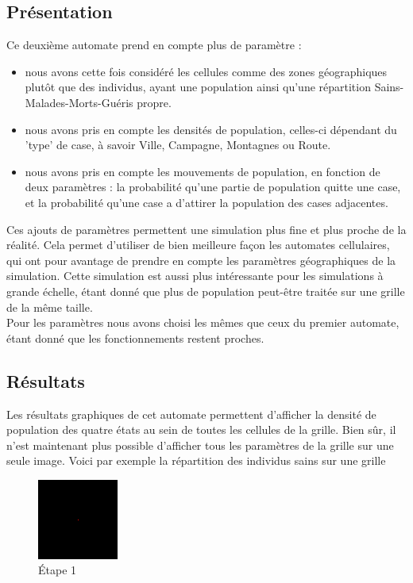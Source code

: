 \documentclass{article}
\begin{document}
\subsection{Présentation}
	Ce deuxième automate prend en compte plus de paramètre : 
	\begin{itemize}
	\item nous avons cette fois considéré les cellules comme des zones géographiques plutôt que des individus, ayant une population ainsi qu'une répartition Sains-Malades-Morts-Guéris propre.
	\item nous avons pris en compte les densités de population, celles-ci dépendant du 'type' de case, à savoir Ville, Campagne, Montagnes ou Route.
	\item nous avons pris en compte les mouvements de population, en fonction de deux paramètres : la probabilité qu'une partie de population quitte une case, et la probabilité qu'une case a d'attirer la population des cases adjacentes.
	\end{itemize}
	
	Ces ajouts de paramètres permettent une simulation plus fine et plus proche de la réalité. Cela permet d'utiliser de bien meilleure façon les automates cellulaires, qui ont pour avantage de prendre en compte les paramètres géographiques de la simulation. Cette simulation est aussi plus intéressante pour les simulations à grande échelle, étant donné que plus de population peut-être traitée sur une grille de la même taille.\\

Pour les paramètres nous avons choisi les mêmes que ceux du premier automate, étant donné que les fonctionnements restent proches. 


\subsection{Résultats}

Les résultats graphiques de cet automate permettent d'afficher la densité de population des quatre états au sein de toutes les cellules de la grille. Bien sûr, il n'est maintenant plus possible d'afficher tous les paramètres de la grille sur une seule image. Voici par exemple la répartition des individus sains sur une grille \\[0.6cm]

\begin{figure}[H]
\caption{Étape 1}
\centering
\includegraphics[scale=2]{../images/Frame-1-maldes-contr.png}
\end{figure}
\end{document}
